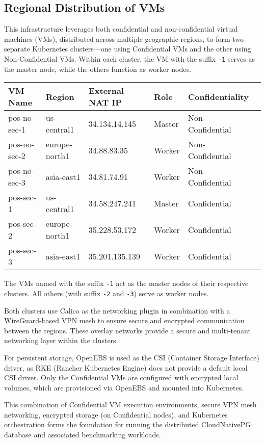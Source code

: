 \subsection{Regional Distribution of VMs}

This infrastructure leverages both confidential and non-confidential virtual machines (VMs), distributed across multiple geographic regions, to form two separate Kubernetes clusters—one using Confidential VMs and the other using Non-Confidential VMs. Within each cluster, the VM with the suffix \texttt{-1} serves as the master node, while the others function as worker nodes.

\begin{longtable}{@{}llllll@{}}
\toprule
\textbf{VM Name} & \textbf{Region} & \textbf{External NAT IP} & \textbf{Role} & \textbf{Confidentiality} \\
\midrule
pos-no-sec-1 & us-central1    & 34.134.14.145    & Master & Non-Confidential \\
pos-no-sec-2 & europe-north1  & 34.88.83.35      & Worker & Non-Confidential \\
pos-no-sec-3 & asia-east1     & 34.81.74.91      & Worker & Non-Confidential \\
pos-sec-1    & us-central1    & 34.58.247.241    & Master & Confidential \\
pos-sec-2    & europe-north1  & 35.228.53.172    & Worker & Confidential \\
pos-sec-3    & asia-east1     & 35.201.135.139   & Worker & Confidential \\
\bottomrule
\end{longtable}

The VMs named with the suffix \texttt{-1} act as the master nodes of their respective clusters. All others (with suffix \texttt{-2} and \texttt{-3}) serve as worker nodes.

Both clusters use Calico as the networking plugin in combination with a WireGuard-based VPN mesh to ensure secure and encrypted communication between the regions. These overlay networks provide a secure and multi-tenant networking layer within the clusters.

For persistent storage, OpenEBS is used as the CSI (Container Storage Interface) driver, as RKE (Rancher Kubernetes Engine) does not provide a default local CSI driver. Only the Confidential VMs are configured with encrypted local volumes, which are provisioned via OpenEBS and mounted into Kubernetes.

This combination of Confidential VM execution environments, secure VPN mesh networking, encrypted storage (on Confidential nodes), and Kubernetes orchestration forms the foundation for running the distributed CloudNativePG database and associated benchmarking workloads.


